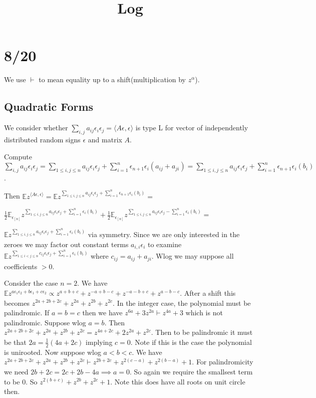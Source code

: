 \documentclass[10pt]{article}
\title{\vspace{-3em}Log}
\newcommand{\E}{\mathbb{E}}
\newcommand{\1}{\textbf{1}}
\newcommand{\shift}{\vdash}
\theoremstyle{remark}
\theoremstyle{definition}
\theoremstyle{prop}
\theoremstyle{Corollary}
\begin{document}
\section{8/20}

We use $\vdash$ to mean equality up to a shift(multiplication by $z^{\alpha}$).

\subsection{Quadratic Forms}

We consider whether $\sum_{i,j} a_{ij} \epsilon_i \epsilon_j = \langle A \epsilon,\epsilon\rangle$ is type L for vector of independently distributed random signs $\epsilon$ and matrix $A$. 

Compute $\sum_{i,j} a_{ij} \epsilon_i \epsilon_j = \sum_{1 \leq i,j\leq n} a_{ij} \epsilon_i \epsilon_j + \sum_{i=1}^n \epsilon_{n+1}\epsilon_i(a_{ij}+a_{ji}) = \sum_{1 \leq i,j\leq n} a_{ij} \epsilon_i \epsilon_j+ \sum_{i=1}^n \epsilon_{n+1}\epsilon_i(b_i)$. 

Then $\E z^{\langle A\epsilon, \epsilon \rangle} = \E z^{\sum_{1 \leq i,j\leq n} a_{ij} \epsilon_i \epsilon_j+ \sum_{i=1}^n \epsilon_{n+1}\epsilon_i(b_i)} =$ 

$\frac{1}{2}\E_{\epsilon_{[n]}}z^{\sum_{1 \leq i,j\leq n} a_{ij} \epsilon_i \epsilon_j+ \sum_{i=1}^n \epsilon_i(b_i)}+\frac{1}{2}\E_{\epsilon_{[n]}}z^{\sum_{1 \leq i,j\leq n} a_{ij} \epsilon_i \epsilon_j- \sum_{i=1}^n \epsilon_i(b_i)}=$

$\E z^{\sum_{1 \leq i,j\leq n} a_{ij} \epsilon_i \epsilon_j+ \sum_{i=1}^n \epsilon_i(b_i)}$ via symmetry. Since we are only interested in the zeroes we may factor out constant terms $a_{i,i}\epsilon_i$ to examine $\E z^{\sum_{1 \leq i<j\leq n} c_{ij} \epsilon_i \epsilon_j+ \sum_{i=1}^n \epsilon_i(b_i)}$ where $c_{ij} = a_{ij}+a_{ji}$. Wlog we may suppose all coefficients $> 0$.

Consider the case $n = 2$. We have $\E z^{a\epsilon_1 \epsilon_2 + b\epsilon_1 + c \epsilon_2} \propto z^{a+b+c} + z^{-a+b-c}+z^{-a-b+c}+z^{a-b-c}$. After a shift this becomes $z^{2a+2b+2c}+z^{2a}+z^{2b}+z^{2c}$. In the integer case, the polynomial must be palindromic. If $a=b=c$ then we have $z^{6a} +3z^{2a} \vdash z^{4a} +3$ which is not palindromic. Suppose wlog $a=b$. Then $z^{2a+2b+2c}+z^{2a}+z^{2b}+z^{2c} = z^{4a+2c}+2z^{2a}+z^{2c}$. Then to be palindromic it must be that $2a = \frac{1}{2}(4a+2c)$ implying $c = 0$. Note if this is the case the polynomial is unirooted. Now suppose wlog  $a<b<c$. We have $z^{2a+2b+2c}+z^{2a}+z^{2b}+z^{2c} \shift z^{2b+2c}+z^{2(c-a)}+z^{2(b-a)}+1$. For palindromicity we need $2b+2c = 2c+2b-4a \implies a = 0$. So again we require the smallsest term to be 0. So $z^{2(b+c)}+z^{2b}+z^{2c}+1$. Note this does have all roots on unit circle then.
\end{document}
